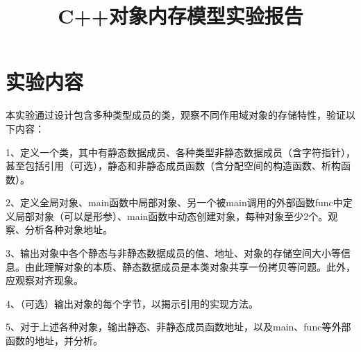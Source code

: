 \documentclass{article}
\begin{document}
\title{C++对象内存模型实验报告}
\author{        }
\maketitle

\section{实验内容}
本实验通过设计包含多种类型成员的类，观察不同作用域对象的存储特性，验证以下内容：

1、定义一个类，其中有静态数据成员、各种类型非静态数据成员（含字符指针），甚至包括引用（可选），静态和非静态成员函数（含分配空间的构造函数、析构函数）。

2、定义全局对象、main函数中局部对象、另一个被main调用的外部函数func中定义局部对象（可以是形参）、main函数中动态创建对象，每种对象至少2个。观察、分析各种对象地址。

3、输出对象中各个静态与非静态数据成员的值、地址、对象的存储空间大小等信息。由此理解对象的本质、静态数据成员是本类对象共享一份拷贝等问题。此外，应观察对齐现象。

4、（可选）输出对象的每个字节，以揭示引用的实现方法。

5、对于上述各种对象，输出静态、非静态成员函数地址，以及main、func等外部函数的地址，并分析。
\end{document}
